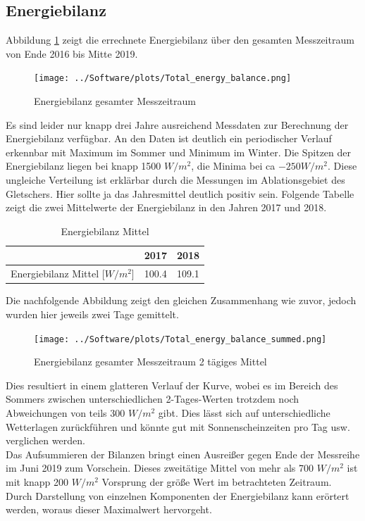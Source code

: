 \documentclass[12pt,a4paper]{article}
\begin{document}
\subsection{Energiebilanz}
Abbildung \ref{fig:Energiebilanz gesamter Messzeitraum} zeigt die errechnete Energiebilanz über den gesamten Messzeitraum von Ende 2016 bis Mitte 2019. 

\begin{figure}[H]
\centering
\texttt{[image: ../Software/plots/Total\_energy\_balance.png]}
\caption{Energiebilanz gesamter Messzeitraum}
\label{fig:Energiebilanz gesamter Messzeitraum}
\end{figure}

Es sind leider nur knapp drei Jahre ausreichend Messdaten zur Berechnung der Energiebilanz verfügbar. An den Daten ist deutlich ein periodischer Verlauf erkennbar mit Maximum im Sommer und Minimum im Winter. Die Spitzen der Energiebilanz liegen bei knapp 1500 $W/m^2$, die Minima bei ca $-250 W/m^2$. Diese ungleiche Verteilung ist erklärbar durch die Messungen im Ablationsgebiet des Gletschers. Hier sollte ja das Jahresmittel deutlich positiv sein. Folgende Tabelle zeigt die zwei Mittelwerte der Energiebilanz in den Jahren 2017 und 2018.


\begin{table}[H]
\centering
{} 
\caption{Energiebilanz Mittel}
\label{tab:Energiebilanz Mittel}
\begin{tabular}{|l|l|l|}
\hline
                                                  & 2017  & 2018  \\ \hline
Energiebilanz Mittel [$W/m^2$] & 100.4 & 109.1 \\ \hline
\end{tabular}
\end{table}

Die nachfolgende Abbildung zeigt den gleichen Zusammenhang wie zuvor, jedoch wurden hier jeweils zwei Tage gemittelt.

\begin{figure}[H]
\centering
\texttt{[image: ../Software/plots/Total\_energy\_balance\_summed.png]}
\caption{Energiebilanz gesamter Messzeitraum 2 tägiges Mittel}
\label{fig:..}
\end{figure}

Dies resultiert in einem glatteren Verlauf der Kurve, wobei es im Bereich des Sommers zwischen unterschiedlichen 2-Tages-Werten trotzdem noch Abweichungen von teils 300 $W/m^2$ gibt. Dies lässt sich auf unterschiedliche Wetterlagen zurückführen und könnte gut mit Sonnenscheinzeiten pro Tag usw. verglichen werden.\\
Das Aufsummieren der Bilanzen bringt einen Ausreißer gegen Ende der Messreihe im Juni 2019 zum Vorschein. Dieses zweitätige Mittel von mehr als 700 $W/m^2$ ist mit knapp 200 $W/m^2$ Vorsprung der größe Wert im betrachteten Zeitraum. Durch Darstellung von einzelnen Komponenten der Energiebilanz kann erörtert werden, woraus dieser Maximalwert hervorgeht.\\
\end{document}
